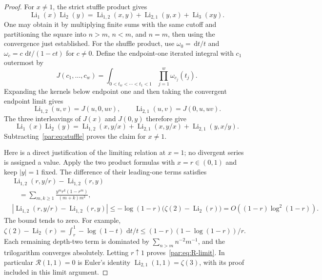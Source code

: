 \documentclass[11pt,a4paper]{article}
\numberwithin{equation}{section}
\theoremstyle{definition}
\theoremstyle{remark}
\DeclareMathOperator{\Li}{Li}
\newcommand{\dd}{\,\mathrm d}
\begin{document}
\begin{proof}
For $x\ne1$, the strict stuffle product gives
\begin{equation}\label{par:eq:stuffle}
 \Li_1(x)\Li_2(y)
 =\Li_{1,2}(x,y)+\Li_{2,1}(y,x)+\Li_3(xy).
\end{equation}
One may obtain it by multiplying finite sums with the same cutoff and
partitioning the square into $n>m$, $n<m$, and $n=m$, then using the
convergence just established.
For the shuffle product, use $\omega_0=\dd t/t$ and
$\omega_c=c\,\dd t/(1-ct)$ for $c\ne0$.
Define the endpoint-one iterated integral with $c_1$ outermost by
\[
 J(c_1,\ldots,c_w)=
 \int_{0<t_w<\cdots<t_1<1}\prod_{j=1}^w\omega_{c_j}(t_j).
\]
Expanding the kernels below endpoint one and then taking the convergent
endpoint limit gives
\[
 \Li_{1,2}(u,v)=J(u,0,uv),\qquad
 \Li_{2,1}(u,v)=J(0,u,uv).
\]
The three interleavings of $J(x)$ and $J(0,y)$ therefore give
\begin{equation}\label{par:eq:shuffle}
 \Li_1(x)\Li_2(y)
 =\Li_{1,2}(x,y/x)+\Li_{2,1}(x,y/x)
       +\Li_{2,1}(y,x/y).
\end{equation}
Subtracting~\eqref{par:eq:stuffle} proves the claim for $x\ne1$.

Here is a direct justification of the limiting relation at $x=1$;
no divergent series is assigned a value. Apply the two product formulas
with $x=r\in(0,1)$ and keep $|y|=1$ fixed. The difference of their
leading-one terms satisfies
\begin{align*}
 &\Li_{1,2}(r,y/r)-\Li_{1,2}(r,y)\\
 &\quad=\sum_{m,k\ge1}
       \frac{y^m r^k(1-r^m)}{(m+k)m^2},\\
 &\left|\Li_{1,2}(r,y/r)-\Li_{1,2}(r,y)\right|
 \le -\log(1-r)\bigl(\zeta(2)-\Li_2(r)\bigr)
 =O\!\left((1-r)\log^2(1-r)\right).
\end{align*}
The bound tends to zero. For example,
$\zeta(2)-\Li_2(r)=\int_r^1-\log(1-t)\,\dd t/t
\le (1-r)(1-\log(1-r))/r$.
Each remaining depth-two term is dominated by
$\sum_{n>m}n^{-2}m^{-1}$, and the trilogarithm converges absolutely.
Letting $r\uparrow1$ proves~\eqref{par:eq:R-limit}.
In particular $\mathcal R(1,1)=0$ is Euler's identity
$\Li_{2,1}(1,1)=\zeta(3)$, with its proof included in this limit argument.
\end{proof}
\end{document}
